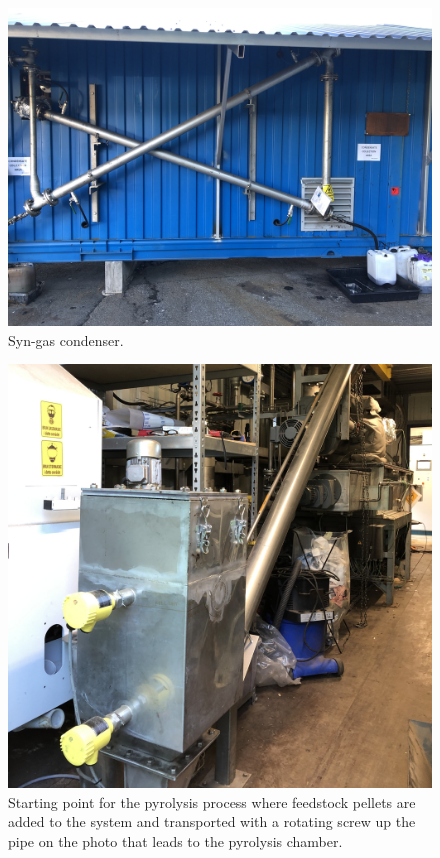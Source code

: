 \begin{figure}
    \centering
    \includegraphics[width=0.74\linewidth,scale=0.74]{Bilder/Pyrolysis/Condenser.png}
    \caption{Syn-gas condenser.}
    \label{fig:condenser}
\end{figure}

\begin{figure}
    \centering
    \includegraphics[width=0.6\linewidth,scale=0.6]{Bilder/Pyrolysis/Feeder.jpg}
    \caption{Starting point for the pyrolysis process where feedstock pellets are added to the system and transported with a rotating screw up the pipe on the photo that leads to the pyrolysis chamber.}
    \label{fig:feeder}
\end{figure}

